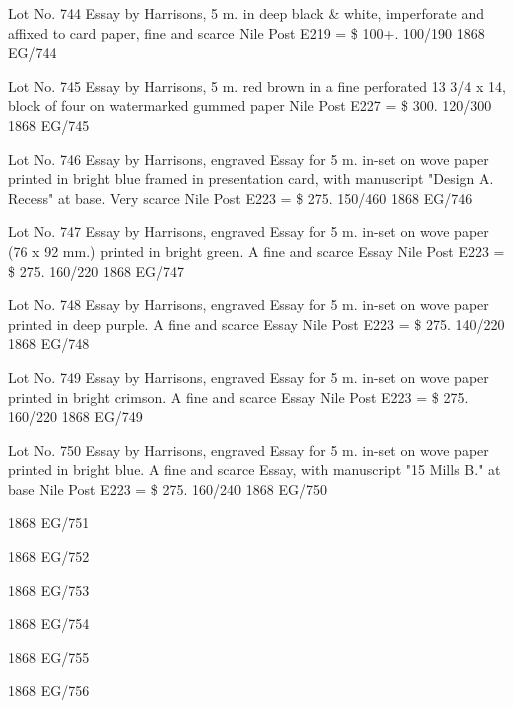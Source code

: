 \documentclass[justified]{tufte-book}
\begin{document}
%
{Lot No. 744
Essay by Harrisons, 5 m. in deep black \& white, imperforate and affixed to card paper, fine and scarce Nile Post E219 = \$ 100+. 100/190
}%
{1868}%
{EG/744}%
{}%
{}
{}%
{}

%
{Lot No. 745
Essay by Harrisons, 5 m. red brown in a fine perforated 13 3/4 x 14, block of four on watermarked gummed paper Nile Post E227 = \$ 300. 120/300
}%
{1868}%
{EG/745}%
{}%
{}
{}%
{}

%
{Lot No. 746
Essay by Harrisons, engraved Essay for 5 m. in-set on wove paper printed in bright blue framed in presentation card, with manuscript "Design A. Recess" at base. Very scarce Nile Post E223 = \$ 275. 150/460
}%
{1868}%
{EG/746}%
{}%
{}
{}%
{}

%
{Lot No. 747
Essay by Harrisons, engraved Essay for 5 m. in-set on wove paper (76 x 92 mm.) printed in bright green. A fine and scarce Essay Nile Post E223 = \$ 275. 160/220
}%
{1868}%
{EG/747}%
{}%
{}
{}%
{}

%
{Lot No. 748
Essay by Harrisons, engraved Essay for 5 m. in-set on wove paper printed in deep purple. A fine and scarce Essay Nile Post E223 = \$ 275. 140/220
}%
{1868}%
{EG/748}%
{}%
{}
{}%
{}

%
{
Lot No. 749
Essay by Harrisons, engraved Essay for 5 m. in-set on wove paper printed in bright crimson. A fine and scarce Essay Nile Post E223 = \$ 275. 160/220
}%
{1868}%
{EG/749}%
{}%
{}
{}%
{}

%
{Lot No. 750
Essay by Harrisons, engraved Essay for 5 m. in-set on wove paper printed in bright blue. A fine and scarce Essay, with manuscript "15 Mills B." at base Nile Post E223 = \$ 275. 160/240
}%
{1868}%
{EG/750}%
{}%
{}
{}%
{}

%
{
}%
{1868}%
{EG/751}%
{}%
{}
{}%
{}

%
{
}%
{1868}%
{EG/752}%
{}%
{}
{}%
{}

%
{
}%
{1868}%
{EG/753}%
{}%
{}
{}%
{}

%
{
}%
{1868}%
{EG/754}%
{}%
{}
{}%
{}

%
{
}%
{1868}%
{EG/755}%
{}%
{}
{}%
{}

%
{
}%
{1868}%
{EG/756}%
{}%
{}
{}%
{}
\end{document}
